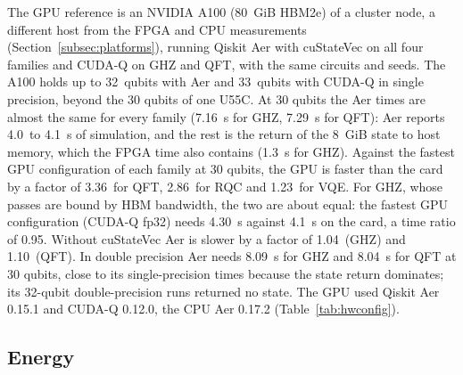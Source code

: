 \documentclass[pdflatex,sn-mathphys-num]{sn-jnl}
\newcommand{\NumFlagDtwohGhzThirty}{1.3}
\newcommand{\NumFlagGhzThirtyEtoE}{4.1}
\newcommand{\NumGpuAerDoubleTGhzThirty}{8.09}
\newcommand{\NumGpuAerDoubleTQftThirty}{8.04}
\newcommand{\NumGpuAerTimeThirtyMax}{4.1}
\newcommand{\NumGpuAerTimeThirtyMin}{4.0}
\newcommand{\NumGpuCudaqSingleMaxN}{33}
\newcommand{\NumGpuCusvGainGhzThirty}{1.04}
\newcommand{\NumGpuCusvGainQftThirty}{1.10}
\newcommand{\NumGpuMaxN}{32}
\newcommand{\NumXplatBestGpuNameGhzThirty}{CUDA-Q fp32}
\newcommand{\NumXplatBestGpuRatioGhzThirty}{0.95}
\newcommand{\NumXplatBestGpuRatioQftThirty}{3.36}
\newcommand{\NumXplatBestGpuRatioRqcThirty}{2.86}
\newcommand{\NumXplatBestGpuRatioVqeThirty}{1.23}
\newcommand{\NumXplatBestGpuTGhzThirty}{4.30}
\newcommand{\NumXplatGpuTGhzThirty}{7.16}
\newcommand{\NumXplatGpuTQftThirty}{7.29}
\theoremstyle{thmstyleone}
\theoremstyle{thmstylethree}
\begin{document}
The GPU reference is an NVIDIA A100 (80~GiB HBM2e) of a cluster node, a different host from the FPGA and CPU
measurements (Section~\ref{subsec:platforms}), running Qiskit Aer with cuStateVec on all four families and CUDA-Q on GHZ and QFT, with the same circuits and
seeds. The A100 holds up to \NumGpuMaxN~qubits with Aer and \NumGpuCudaqSingleMaxN~qubits with CUDA-Q in single precision,
beyond the 30 qubits of one U55C. At 30 qubits the Aer times are almost the same for every family
(\NumXplatGpuTGhzThirty~s for GHZ, \NumXplatGpuTQftThirty~s for QFT): Aer reports \NumGpuAerTimeThirtyMin~to
\NumGpuAerTimeThirtyMax~s of simulation, and the rest is the return of the 8~GiB state to host memory, which the FPGA time
also contains (\NumFlagDtwohGhzThirty~s for GHZ). Against the fastest GPU configuration of each family at 30 qubits, the GPU
is faster than the card by a factor of \NumXplatBestGpuRatioQftThirty~for QFT, \NumXplatBestGpuRatioRqcThirty~for RQC and
\NumXplatBestGpuRatioVqeThirty~for VQE. For GHZ, whose passes are bound by HBM bandwidth, the two are about equal: the
fastest GPU configuration (\NumXplatBestGpuNameGhzThirty) needs \NumXplatBestGpuTGhzThirty~s against \NumFlagGhzThirtyEtoE~s on
the card, a time ratio of \NumXplatBestGpuRatioGhzThirty. Without cuStateVec Aer is slower by a factor of
\NumGpuCusvGainGhzThirty~(GHZ) and \NumGpuCusvGainQftThirty~(QFT). In double precision Aer needs \NumGpuAerDoubleTGhzThirty~s
for GHZ and \NumGpuAerDoubleTQftThirty~s for QFT at 30 qubits, close to its single-precision times because the state return
dominates; its 32-qubit double-precision runs returned no state. The GPU used Qiskit Aer 0.15.1 and CUDA-Q 0.12.0, the CPU
Aer 0.17.2 (Table~\ref{tab:hwconfig}).

\subsection{Energy}\label{subsec:res-energy}
\end{document}
